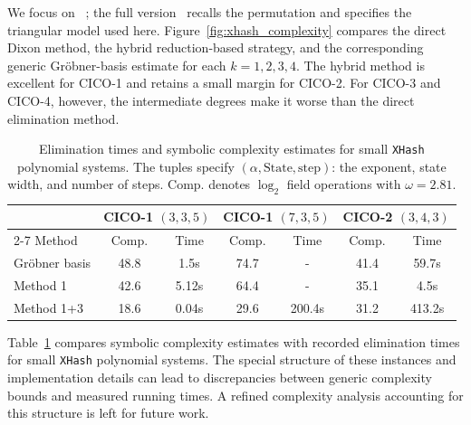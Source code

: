 We focus on \xhash~\cite{DBLP:journals/iacr/AshurKM23}; the full version~\cite{cryptoeprint:2026/1969} recalls the permutation and specifies the triangular model used here. Figure~\ref{fig:xhash_complexity} compares the direct Dixon method, the hybrid reduction-based strategy, and the corresponding generic Gr\"obner-basis estimate for each $k=1,2,3,4$. The hybrid method is excellent for CICO-1 and retains a small margin for CICO-2. For CICO-3 and CICO-4, however, the intermediate degrees make it worse than the direct elimination method.


\begin{table}[h]
\centering
\caption{Elimination times and symbolic complexity estimates for small \texttt{XHash} polynomial systems. The tuples specify $(\alpha,\mathrm{State},\mathrm{step})$: the exponent, state width, and number of steps. Comp. denotes $\log_2$ field operations with $\omega=2.81$.}
\label{tab:xhash_experimental}
\begin{tabular}{l|cc|cc|cc}
\toprule
 & \multicolumn{2}{c|}{CICO-1 $(3,3,5)$} & \multicolumn{2}{c|}{CICO-1 $(7,3,5)$} & \multicolumn{2}{c}{CICO-2 $(3,4,3)$} \\
\cmidrule{2-7}
Method & Comp. & Time & Comp. & Time & Comp. & Time \\
\midrule
Gr\"obner basis & 48.8 & 1.5s & 74.7 & - & 41.4 & 59.7s \\
Method 1 & 42.6 & 5.12s & 64.4 & - & 35.1 & 4.5s \\
Method 1+3 & 18.6 & 0.04s & 29.6 & 200.4s & 31.2 & 413.2s \\
\bottomrule
\end{tabular}
\end{table}

Table~\ref{tab:xhash_experimental} compares symbolic complexity estimates with recorded elimination times for small \texttt{XHash} polynomial systems. The special structure of these instances and implementation details can lead to discrepancies between generic complexity bounds and measured running times. A refined complexity analysis accounting for this structure is left for future work.
